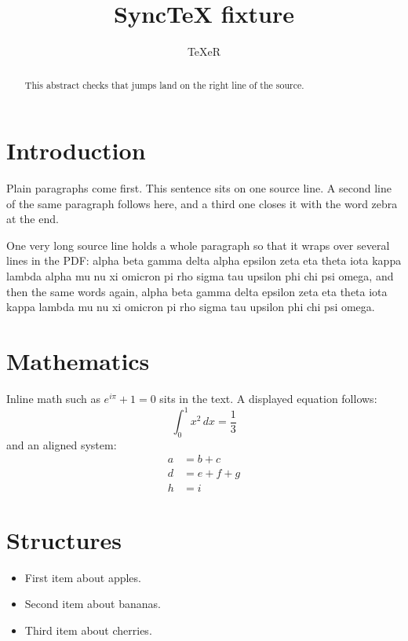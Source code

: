 \documentclass[11pt]{article}
\title{SyncTeX fixture}
\author{TeXeR}
\begin{document}
\maketitle
\tableofcontents

\begin{abstract}
This abstract checks that jumps land on the right line of the source.
\end{abstract}

\section{Introduction}
Plain paragraphs come first. This sentence sits on one source line.
A second line of the same paragraph follows here,
and a third one closes it with the word zebra at the end.


One very long source line holds a whole paragraph so that it wraps over several lines in the PDF: alpha beta gamma delta alpha epsilon zeta eta theta iota kappa lambda alpha mu nu xi omicron pi rho sigma tau upsilon phi chi psi omega, and then the same words again, alpha beta gamma delta epsilon zeta eta theta iota kappa lambda mu nu xi omicron pi rho sigma tau upsilon phi chi psi omega.

\section{Mathematics}
Inline math such as $e^{i\pi} + 1 = 0$ sits in the text.
A displayed equation follows:
\begin{equation}
  \int_0^1 x^2 \, dx = \frac{1}{3}
\end{equation}
and an aligned system:
\begin{align}
  a &= b + c \\
  d &= e + f + g \\
  h &= i
\end{align}

\section{Structures}
\begin{itemize}
  \item First item about apples.
  \item Second item about bananas.
  \item Third item about cherries.
\end{itemize}
\end{document}
